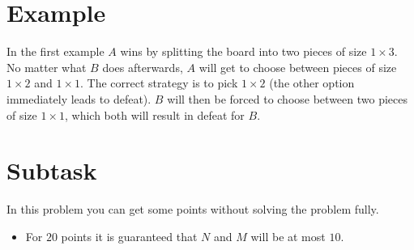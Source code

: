 \section*{Example}
In the first example $A$ wins by splitting the board into two pieces of size $1 \times 3$.
No matter what $B$ does afterwards, $A$ will get to choose between pieces of size $1 \times 2$
and $1 \times 1$. The correct strategy is to pick $1 \times 2$ (the other option immediately leads
to defeat). $B$ will then be forced to choose between two pieces of size $1 \times 1$, which both
will result in defeat for $B$.

\section*{Subtask}

In this problem you can get some points without solving the problem fully.

\begin{itemize}
    \item For $20$ points it is guaranteed that $N$ and $M$ will be at most $10$.
\end{itemize}
